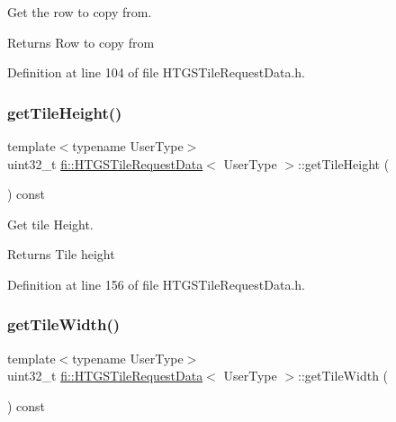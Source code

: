 Get the row to copy from. 

\begin{DoxyReturn}{Returns}
Row to copy from 
\end{DoxyReturn}


Definition at line 104 of file H\+T\+G\+S\+Tile\+Request\+Data.\+h.

\mbox{\label{classfi_1_1HTGSTileRequestData_a4e7345337a9d60ccb6f00eabac4b0032}} 
\subsubsection{\texorpdfstring{get\+Tile\+Height()}{getTileHeight()}}
{\footnotesize\ttfamily template$<$typename User\+Type$>$ \\
uint32\+\_\+t \hyperlink{classfi_1_1HTGSTileRequestData}{fi\+::\+H\+T\+G\+S\+Tile\+Request\+Data}$<$ User\+Type $>$\+::get\+Tile\+Height (\begin{DoxyParamCaption}{ }\end{DoxyParamCaption}) const\hspace{0.3cm}{\ttfamily [inline]}}



Get tile Height. 

\begin{DoxyReturn}{Returns}
Tile height 
\end{DoxyReturn}


Definition at line 156 of file H\+T\+G\+S\+Tile\+Request\+Data.\+h.

\mbox{\label{classfi_1_1HTGSTileRequestData_a10db9ee1aabf369a6d1e06c95392f869}} 
\subsubsection{\texorpdfstring{get\+Tile\+Width()}{getTileWidth()}}
{\footnotesize\ttfamily template$<$typename User\+Type$>$ \\
uint32\+\_\+t \hyperlink{classfi_1_1HTGSTileRequestData}{fi\+::\+H\+T\+G\+S\+Tile\+Request\+Data}$<$ User\+Type $>$\+::get\+Tile\+Width (\begin{DoxyParamCaption}{ }\end{DoxyParamCaption}) const\hspace{0.3cm}{\ttfamily [inline]}}



